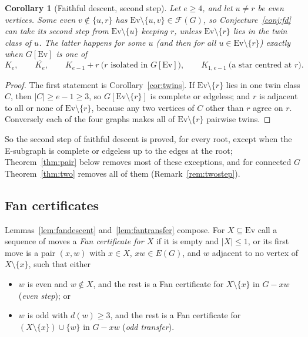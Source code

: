 \documentclass[11pt]{amsart}
\newtheorem{corollary}[theorem]{Corollary}
\theoremstyle{definition}
\newcommand{\cF}{\mathcal F}
\newcommand{\Ev}{\mathrm{Ev}}
\begin{document}
\begin{corollary}[Faithful descent, second step]\label{cor:fd2}
Let $e\ge4$, and let $u\ne r$ be even vertices. Some even $v\notin\{u,r\}$ has
$\Ev\setminus\{u,v\}\in\cF(G)$, so Conjecture~\ref{conj:fd} can take its second step from
$\Ev\setminus\{u\}$ keeping $r$, unless $\Ev\setminus\{r\}$ lies in the twin class of $u$. The latter
happens for some $u$ (and then for all $u\in\Ev\setminus\{r\}$) exactly when $G[\Ev]$ is one of
\[
K_e,\qquad \overline{K_e},\qquad K_{e-1}+r\ \text{($r$ isolated in $G[\Ev]$)},\qquad
K_{1,e-1}\ \text{(a star centred at $r$)}.
\]
\end{corollary}

\begin{proof}
The first statement is Corollary~\ref{cor:twins}. If $\Ev\setminus\{r\}$ lies in one twin class
$C$, then $|C|\ge e-1\ge3$, so $G[\Ev\setminus\{r\}]$ is complete or edgeless; and $r$ is adjacent to
all or none of $\Ev\setminus\{r\}$, because any two vertices of $C$ other than $r$ agree on $r$.
Conversely each of the four graphs makes all of $\Ev\setminus\{r\}$ pairwise twins.
\end{proof}

So the second step of faithful descent is proved, for every root, except when the E-subgraph is
complete or edgeless up to the edges at the root; Theorem~\ref{thm:pair} below removes most of
these exceptions, and for connected $G$ Theorem~\ref{thm:two} removes all of them
(Remark~\ref{rem:twostep}).

\subsection{Fan certificates}

Lemmas~\ref{lem:fandescent} and~\ref{lem:fantransfer} compose. For $X\subseteq\Ev$ call a sequence of
moves a \emph{Fan certificate for $X$} if it is empty and $|X|\le1$, or its first move is a pair
$(x,w)$ with $x\in X$, $xw\in E(G)$, and $w$ adjacent to no vertex of $X\setminus\{x\}$, such that
either
\begin{itemize}
\item[(E)] $w$ is even and $w\notin X$, and the rest is a Fan certificate for $X\setminus\{x\}$ in
$G-xw$ (\emph{even step}); or
\item[(O)] $w$ is odd with $d(w)\ge3$, and the rest is a Fan certificate for
$(X\setminus\{x\})\cup\{w\}$ in $G-xw$ (\emph{odd transfer}).
\end{itemize}
\end{document}
